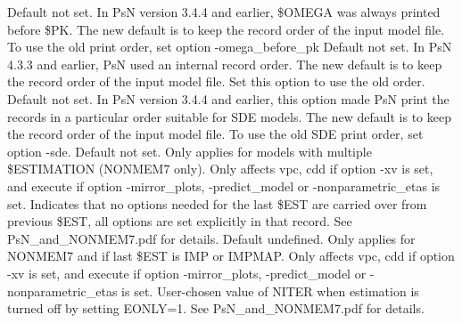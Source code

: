 \begin{optionlist}
Default not set. In PsN version 3.4.4 and earlier, \$OMEGA was always printed before \$PK. The new default is to keep the record order of the input model file. To use the old print order, set option -omega\_before\_pk
\nextopt
{}
Default not set. In PsN 4.3.3 and earlier, PsN used an internal record order. The new default is to keep the record order of the input model file. Set this option to use the old order.
\nextopt
{}
Default not set. In PsN version 3.4.4 and earlier, this option made PsN print the records
in a particular order suitable for SDE models.
The new default is to keep the record order of the input model file. To use the old SDE print order, 
set option -sde.
\nextopt
{}
Default not set. Only applies for models with multiple \$ESTIMATION (NONMEM7 only). 
Only affects vpc,  cdd if option -xv is set, and execute if option -mirror\_plots,
-predict\_model or -nonparametric\_etas is set. Indicates that no options needed for the last \$EST 
are carried over from previous \$EST, all options are set explicitly in that record. See PsN\_and\_NONMEM7.pdf 
for details. 
\nextopt
{}
Default undefined. Only applies for NONMEM7 and if last \$EST is IMP or IMPMAP. 
Only affects vpc,  cdd if option -xv is set, and execute if option -mirror\_plots, -predict\_model
 or -nonparametric\_etas is set. 
User-chosen value of NITER when estimation is turned off by setting EONLY=1. See PsN\_and\_NONMEM7.pdf for details. 
\nextopt
\end{optionlist}
